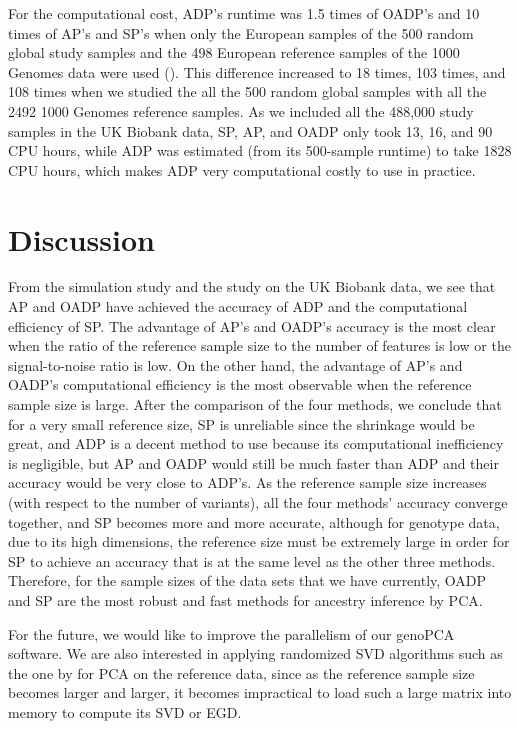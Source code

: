 \documentclass{article}
\begin{document}
For the computational cost,
ADP's runtime was 1.5 times of OADP's and 10 times of AP's and SP's
when only the European samples
of the 500 random global study samples
and the 498 European reference samples of the 1000 Genomes data
were used ().
This difference increased to 18 times, 103 times, and 108 times
when we studied the all the 500 random global samples
with all the 2492 1000 Genomes reference samples.
As we included all the 488,000 study samples in the UK Biobank data,
SP, AP, and OADP only took 13, 16, and 90 CPU hours,
while ADP was estimated (from its 500-sample runtime)
to take 1828 CPU hours,
which makes ADP very computational costly to use in practice.

\section{Discussion}

From the simulation study and the study on the UK Biobank data,
we see that AP and OADP have achieved the accuracy of ADP
and the computational efficiency of SP.
The advantage of AP's and OADP's accuracy
is the most clear
when the ratio of the reference sample size
to the number of features is low
or the signal-to-noise ratio is low.
On the other hand,
the advantage of AP's and OADP's computational efficiency
is the most observable when the reference sample size is large.
After the comparison of the four methods,
we conclude that for a very small reference size,
SP is unreliable since the shrinkage would be great,
and ADP is a decent method to use
because its computational inefficiency is negligible,
but AP and OADP would still be much faster than ADP
and their accuracy would be very close to ADP's.
As the reference sample size increases
(with respect to the number of variants),
all the four methods' accuracy converge together,
and SP becomes more and more accurate,
although for genotype data,
due to its high dimensions,
the reference size must be extremely large
in order for SP to achieve an accuracy
that is at the same level as the other three methods.
Therefore, for the sample sizes
of the data sets that we have currently,
OADP and SP are the most robust and fast methods
for ancestry inference by PCA.

For the future, we would like
to improve the parallelism of our genoPCA software.
We are also interested in applying randomized SVD algorithms
such as the one by \citet{halko2011finding}
for PCA on the reference data,
since as the reference sample size becomes larger and larger,
it becomes impractical to load such a large matrix into memory
to compute its SVD or EGD.
\end{document}

